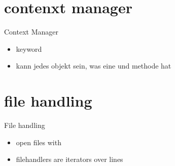 \section{contenxt manager}
\begin{frame}{Context Manager}
\begin{itemize}
	\item keyword 
	\item kann jedes objekt sein, was eine  und  methode hat
\end{itemize}
\end{frame}
\begin{frame}{}
	
\end{frame}

\section{file handling}
\begin{frame}{File handling}
\begin{itemize}
	\item open files with 
	\item filehandlers are iterators over lines
\end{itemize}
\end{frame}
\begin{frame}{}
	
\end{frame}


